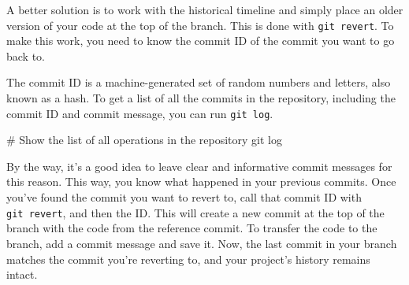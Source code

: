 \documentclass[
  letterpaper,
  DIV=11,
  numbers=noendperiod]{scrreprt}
\newenvironment{Shaded}{\begin{snugshade}}{\end{snugshade}}
\newcommand{\NormalTok}[1]{\textcolor[rgb]{0.00,0.23,0.31}{#1}}
\begin{document}
A better solution is to work with the historical timeline and simply
place an older version of your code at the top of the branch. This is
done with \texttt{git\ revert}. To make this work, you need to know the
commit ID of the commit you want to go back to.

The commit ID is a machine-generated set of random numbers and letters,
also known as a hash. To get a list of all the commits in the
repository, including the commit ID and commit message, you can run
\texttt{git\ log}.

\begin{Shaded}
\begin{Highlighting}[]
\NormalTok{\# Show the list of all operations in the repository}
\NormalTok{git log}
\end{Highlighting}
\end{Shaded}

By the way, it's a good idea to leave clear and informative commit
messages for this reason. This way, you know what happened in your
previous commits. Once you've found the commit you want to revert to,
call that commit ID with \texttt{git\ revert}, and then the ID. This
will create a new commit at the top of the branch with the code from the
reference commit. To transfer the code to the branch, add a commit
message and save it. Now, the last commit in your branch matches the
commit you're reverting to, and your project's history remains intact.
\end{document}
